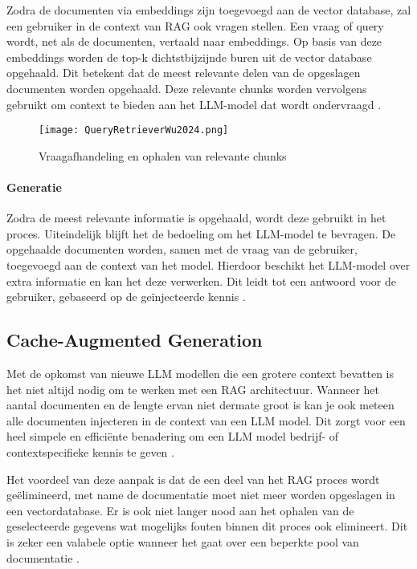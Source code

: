     Zodra de documenten via embeddings zijn toegevoegd aan de vector database, zal een gebruiker in de context van RAG ook vragen stellen. Een vraag of query wordt, net als de documenten, vertaald naar embeddings. Op basis van deze embeddings worden de top-k dichtstbijzijnde buren uit de vector database opgehaald. Dit betekent dat de meest relevante delen van de opgeslagen documenten worden opgehaald. Deze relevante chunks worden vervolgens gebruikt om context te bieden aan het LLM-model dat wordt ondervraagd \autocite{wu2025retrievalaugmentedgenerationnaturallanguage}.
    
            
    \begin{figure}[H]
        \centering
        \texttt{[image: QueryRetrieverWu2024.png]}
        \caption{Vraagafhandeling en ophalen van relevante chunks \autocite{wu2025retrievalaugmentedgenerationnaturallanguage}}
        \label{fig:RAG bevragen vector database}
    \end{figure}
    
    \paragraph{Generatie}
    
    Zodra de meest relevante informatie is opgehaald, wordt deze gebruikt in het proces. Uiteindelijk blijft het de bedoeling om het LLM-model te bevragen. De opgehaalde documenten worden, samen met de vraag van de gebruiker, toegevoegd aan de context van het model. Hierdoor beschikt het LLM-model over extra informatie en kan het deze verwerken. Dit leidt tot een antwoord voor de gebruiker, gebaseerd op de geïnjecteerde kennis \autocite{zhao2024retrievalaugmentedgenerationaigeneratedcontent}.
    
    \subsection{Cache-Augmented Generation}
    
    Met de opkomst van nieuwe LLM modellen die een grotere context bevatten is het niet altijd nodig om te werken met een RAG architectuur. Wanneer het aantal documenten en de lengte ervan niet dermate groot is kan je ook meteen alle documenten injecteren in de context van een LLM model. Dit zorgt voor een heel simpele en efficiënte benadering om een LLM model bedrijf- of contextspecifieke kennis te geven \autocite{Chan_2025}.
    
    Het voordeel van deze aanpak is dat de een deel van het RAG proces wordt geëlimineerd, met name de documentatie moet niet meer worden opgeslagen in een vectordatabase. 
    Er is ook niet langer nood aan het ophalen van de geselecteerde gegevens wat mogelijks fouten binnen dit proces ook elimineert. Dit is zeker een valabele optie wanneer het gaat over een beperkte pool van documentatie \autocite{Chan_2025}. 
    
